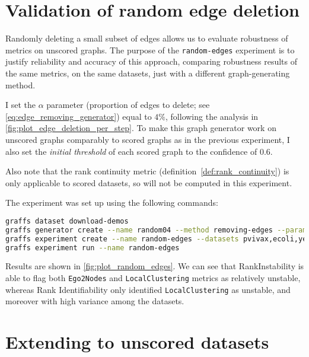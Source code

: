 \section{Validation of random edge deletion}



Randomly deleting a small subset of edges allows us to evaluate robustness of metrics on unscored graphs.
The purpose of the \texttt{random-edges} experiment is to justify reliability and accuracy of this approach, comparing robustness results of the same metrics, on the same datasets, just with a different graph-generating method.

I set the $\alpha$ parameter (proportion of edges to delete; see \autoref{eq:edge_removing_generator}) equal to $4\%$, following the analysis in \autoref{fig:plot_edge_deletion_per_step}.
To make this graph generator work on unscored graphs comparably to scored graphs as in the previous experiment, I also set the \textsl{initial threshold} of each scored graph to the confidence of $0.6$.

Also note that the rank continuity metric (definition~\ref{def:rank_continuity}) is only applicable to scored datasets, so will not be computed in this experiment.

The experiment was set up using the following commands:
\begin{lstlisting}[language=bash]
graffs dataset download-demos
graffs generator create --name random04 --method removing-edges --params 0.04,600 -n 31 --seed 7
graffs experiment create --name random-edges --datasets pvivax,ecoli,yeast --generator random04 --metrics Betweenness,Degree,Ego1Edges,Ego2Nodes,LocalClustering,PageRank,Redundancy --robustnessMeasures RankIdentifiability,RankInstability
graffs experiment run --name random-edges
\end{lstlisting}



Results are shown in \autoref{fig:plot_random_edges}.
We can see that RankInstability is able to flag both \texttt{Ego2Nodes} and \texttt{LocalClustering} metrics as relatively unstable, whereas Rank Identifiability only identified \texttt{LocalClustering} as unstable, and moreover with high variance among the datasets.


\section{Extending to unscored datasets}

